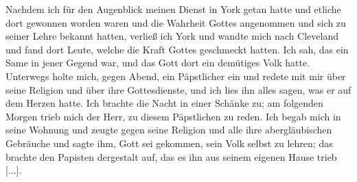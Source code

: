 Nachdem ich für den Augenblick meinen Dienst in York getan
hatte und etliche dort gewonnen worden waren und die Wahrheit
Gottes angenommen und sich zu seiner Lehre bekannt hatten,
verließ ich York und wandte mich nach 
Cleveland und fand dort
Leute, welche die Kraft Gottes geschmeckt hatten. Ich sah, das
ein Same in jener Gegend war, und das Gott dort ein demütiges
Volk hatte. Unterwegs holte mich, gegen Abend, ein Päpstlicher
ein und redete mit mir über seine Religion und über ihre 
Gottesdienste, und ich lies ihn alles sagen, was er auf dem Herzen
hatte. Ich brachte die Nacht in einer Schänke zu; am folgenden
Morgen trieb mich der Herr, zu diesem 
Päpstlichen zu reden. Ich
begab mich in seine Wohnung und zeugte gegen seine Religion
und alle ihre abergläubischen Gebräuche und sagte ihm, Gott sei
gekommen, sein Volk selbst zu lehren; das brachte den Papisten
dergestalt auf, das es ihn aus seinem eigenen Hause trieb [...].

